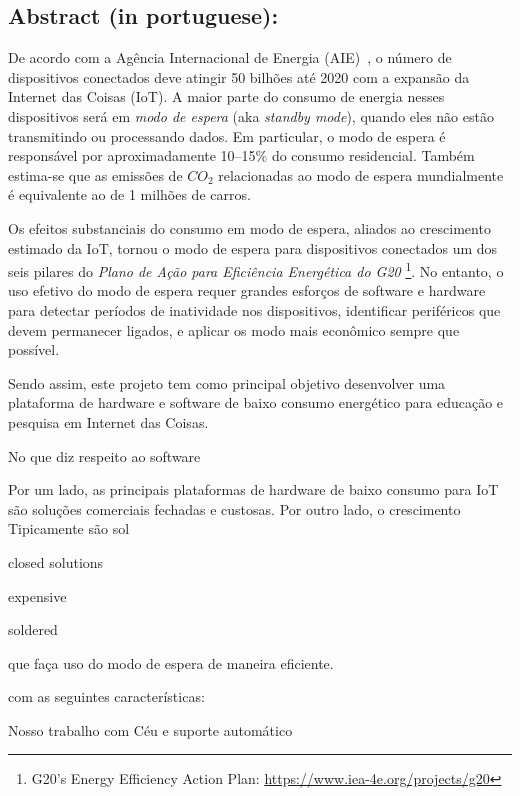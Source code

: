 \documentclass[titlepage,12pt]{article}
\begin{document}
\subsection{ Abstract (in portuguese): }


De acordo com a Agência Internacional de Energia (AIE)~\cite{iea.data}, o
número de dispositivos conectados deve atingir 50 bilhões até 2020 com a
expansão da Internet das Coisas (IoT).
A maior parte do consumo de energia nesses dispositivos será em
\emph{modo de espera} (aka \emph{standby mode}), quando eles não estão
transmitindo ou processando dados.
Em particular, o modo de espera é responsável por aproximadamente 10--15\% do
consumo residencial.
Também estima-se que as emissões de $CO_2$ relacionadas ao modo de espera
mundialmente é equivalente ao de 1 milhões de carros.

Os efeitos substanciais do consumo em modo de espera, aliados ao crescimento
estimado da IoT, tornou o modo de espera para dispositivos conectados um dos
seis pilares do \emph{Plano de Ação para Eficiência Energética do G20}%
\footnote{G20's Energy Efficiency Action Plan: \url{https://www.iea-4e.org/projects/g20}}.
No entanto, o uso efetivo do modo de espera requer grandes esforços de software
e hardware para detectar períodos de inatividade nos dispositivos, identificar
periféricos que devem permanecer ligados, e aplicar os modo mais econômico
sempre que possível.

Sendo assim, este projeto tem como principal objetivo desenvolver uma
plataforma de hardware e software de baixo consumo energético para educação e
pesquisa em Internet das Coisas.

No que diz respeito ao software

Por um lado, as principais plataformas de hardware de baixo consumo para IoT
são soluções comerciais fechadas e custosas.
Por outro lado, o crescimento
Tipicamente são sol


closed solutions

expensive

soldered


 que faça uso do modo de espera de maneira eficiente.

 com
as seguintes características:


Nosso trabalho com Céu e suporte automático

\begin{comment}

Problemas com hardware para pesquisa científica
    - flexibilidade é importante
    - principalmente para o radio
    - custo para reproduzir
        - SoC, SMD, prontos/caros/inflexíveis
    - consumo ainda alto
        - transistores para desligar sensores
    - Solução
        - módulos off-the-shelf de fácil ligacao, jumpers/headers/solda/PCB vs SMD
        - The main advantages of SMT over the older through-hole technique are: 
            - https://en.wikipedia.org/wiki/Through-hole_technology
            - https://en.wikipedia.org/wiki/Surface-mount_technology

\end{comment}
\end{document}
